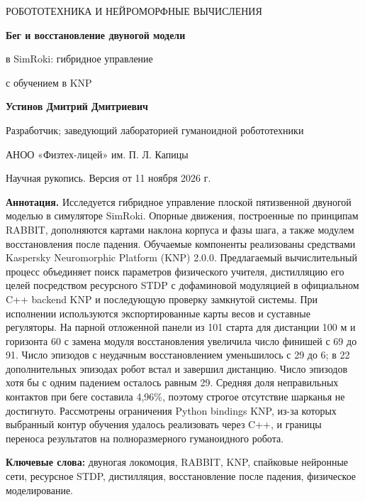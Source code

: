\documentclass[11pt,a4paper]{article}
\begin{document}
\thispagestyle{plain}
\begin{flushleft}
{\small\sffamily\color{inkblue} РОБОТОТЕХНИКА И НЕЙРОМОРФНЫЕ ВЫЧИСЛЕНИЯ}\par
\vspace{5pt}
{\LARGE\bfseries Бег и восстановление двуногой модели\par в SimRoki: гибридное управление\par с обучением в KNP}\par
\vspace{11pt}
{\large\bfseries Устинов Дмитрий Дмитриевич}\par
\vspace{3pt}
Разработчик; заведующий лабораторией гуманоидной робототехники\par
АНОО «Физтех-лицей» им. П. Л. Капицы\par
\vspace{6pt}
{\small Научная рукопись. Версия от 11 ноября 2026 г.}
\end{flushleft}
\vspace{1pt}
\noindent\textbf{Аннотация.}
Исследуется гибридное управление плоской пятизвенной двуногой моделью в симуляторе SimRoki. Опорные движения, построенные по принципам RABBIT, дополняются картами наклона корпуса и фазы шага, а также модулем восстановления после падения. Обучаемые компоненты реализованы средствами Kaspersky Neuromorphic Platform (KNP) 2.0.0. Предлагаемый вычислительный процесс объединяет поиск параметров физического учителя, дистилляцию его целей посредством ресурсного STDP с дофаминовой модуляцией в официальном C++ backend KNP и последующую проверку замкнутой системы. При исполнении используются экспортированные карты весов и суставные регуляторы. На парной отложенной панели из 101 старта для дистанции 100 м и горизонта 60 с замена модуля восстановления увеличила число финишей с 69 до 91. Число эпизодов с неудачным восстановлением уменьшилось с 29 до 6; в 22 дополнительных эпизодах робот встал и завершил дистанцию. Число эпизодов хотя бы с одним падением осталось равным 29. Средняя доля неправильных контактов при беге составила 4,96\%, поэтому строгое отсутствие шарканья не достигнуто. Рассмотрены ограничения Python bindings KNP, из-за которых выбранный контур обучения удалось реализовать через C++, и границы переноса результатов на полноразмерного гуманоидного робота.

\vspace{5pt}
\noindent\textbf{Ключевые слова:} двуногая локомоция, RABBIT, KNP, спайковые нейронные сети, ресурсное STDP, дистилляция, восстановление после падения, физическое моделирование.
\end{document}
